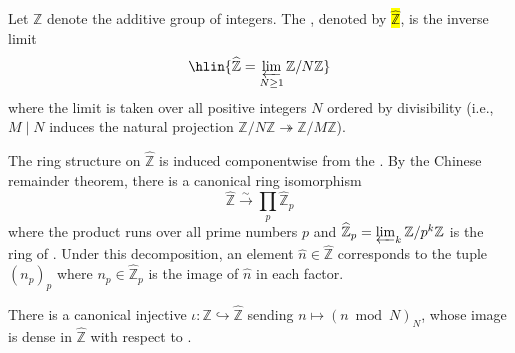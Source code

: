 \begin{definition} \label{definition:profinite_completion_of_Z}
Let $\mathbb{Z}$ denote the additive group of integers. The , denoted by \hl{$\widehat{\mathbb{Z}}$}, is the inverse limit
$$\hlin{\widehat{\mathbb{Z}} = \varprojlim_{N \geq 1} \mathbb{Z}/N\mathbb{Z}}$$
where the limit is taken over all positive integers $N$ ordered by divisibility (i.e., $M \mid N$ induces the natural projection $\mathbb{Z}/N\mathbb{Z} \twoheadrightarrow \mathbb{Z}/M\mathbb{Z}$). 

The ring structure on $\widehat{\mathbb{Z}}$ is induced componentwise from the . By the Chinese remainder theorem, there is a canonical ring isomorphism
$$\widehat{\mathbb{Z}} \xrightarrow{\sim} \prod_{p} \widehat{\mathbb{Z}}_p$$
where the product runs over all prime numbers $p$ and $\widehat{\mathbb{Z}}_p = \varprojlim_k \mathbb{Z}/p^k\mathbb{Z}$ is the ring of . Under this decomposition, an element $\hat{n} \in \widehat{\mathbb{Z}}$ corresponds to the tuple $(n_p)_p$ where $n_p \in \widehat{\mathbb{Z}}_p$ is the image of $\hat{n}$ in each factor.

There is a canonical injective  $\iota: \mathbb{Z} \hookrightarrow \widehat{\mathbb{Z}}$ sending $n \mapsto (n \bmod N)_N$, whose image is dense in $\widehat{\mathbb{Z}}$ with respect to .



\end{definition}
